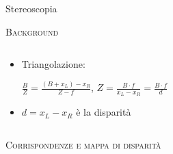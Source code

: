 \documentclass{beamer}
\begin{document}
\begin{section}{Stereoscopia}
\begin{frame}[t]{\textsc{Background}}
\begin{columns}
\begin{column}{5cm}
\begin{itemize}
\item \small{Triangolazione}:

\begin{center}
 $\frac{B}{Z} = \frac{(B+x_{L}) - x_{R}}{Z-f}$,
$Z = \frac{B \cdot f}{x_{L} - x_{R}} = \frac{B \cdot f}{d}$
\end{center}


\item  $ d = x_{L} - x_{R} $ \`{e} la disparit\`{a} 
\end{itemize}

\end{column}
\end{columns}
\end{frame}


\begin{frame}[t]{\textsc{Corrispondenze e mappa di disparit\`{a}}}



\end{frame}
\end{section}
\end{document}
